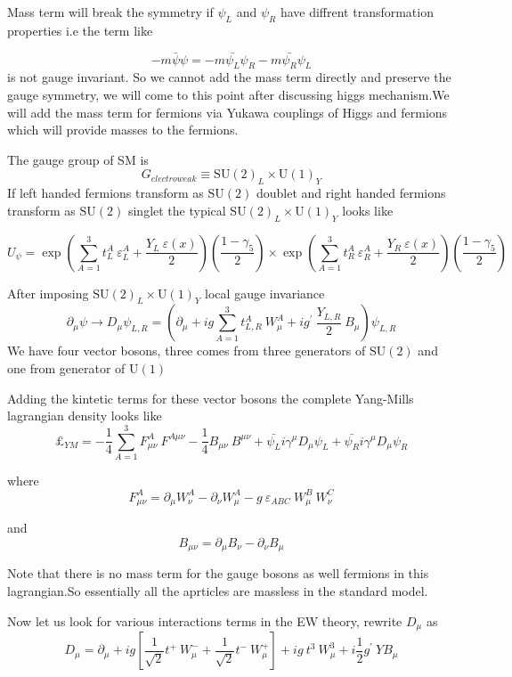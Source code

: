 \documentclass[12pt]{article}
\newcommand{\be}{\begin{equation}}
\newcommand{\ee}{\end{equation}}
\begin{document}
Mass term will break the symmetry if $\psi_{L}$ and $\psi_{R}$  have diffrent transformation properties i.e the term like 

%
\be-m\bar{\psi}\psi=-m\bar{\psi_{L}}\psi_{R}-m\bar{\psi_{R}}\psi_{L}\ee
%
is not gauge invariant. So we cannot add the mass term directly and preserve the gauge symmetry, we will come to this point after discussing higgs mechanism.We will add the mass term for fermions via Yukawa couplings of Higgs and fermions which will provide masses to the fermions.

The gauge group of SM is
%
\be G_{electroweak} \equiv  \mathrm{SU}(2)_L \times \mathrm{U}(1)_Y\ee
%
If left handed fermions transform as  $\mathrm{SU}(2)$ doublet and right handed fermions transform as $\mathrm{SU}(2)$ singlet the typical 
$  \mathrm{SU}(2)_L \times \mathrm{U}(1)_Y$ looks like
 

\be U_{\psi} = \exp{ \left( \sum_{A=1}^{3} t_{L}^{A} ~\varepsilon _{L}^{A} +\frac{Y_{L}~ \varepsilon(x)}{2} \right )} \left (\frac{1-\gamma_{5}}{2} \right )\times \exp{ \left( \sum_{A=1}^{3} t_{R}^{A}~ \varepsilon _{R}^{A} +\frac{Y_{R} ~\varepsilon(x)}{2} \right)} \left (\frac{1-\gamma_{5}}{2} \right )\ee 

After imposing $\mathrm{SU}(2)_L \times \mathrm{U}(1)_Y$ local gauge invariance
\be
{ \partial_{\mu}\psi \rightarrow D_{\mu}} \psi_{L,R} =\left (\partial_{\mu} + ig \sum_{A=1}^{3} t_{L,R}^A ~W_{\mu}^A + ig^{'}~ \frac{Y_{L,R}}{2} ~B_{\mu}\right) \psi_{L,R}
\ee
We have four vector bosons, three comes from three generators of 
$\mathrm{SU}(2)$ and one from generator of $\mathrm{U}(1)$

Adding the kintetic terms for these vector bosons the complete Yang-Mills lagrangian density  looks like
\be \pounds_{YM}= -\frac{1}{4} \sum_{A=1}^{3} F_{\mu \nu}^{A}~ F^{A \mu \nu} - \frac{1}{4}B_{\mu \nu}~ B^{\mu \nu }+ \bar{\psi_{L}} i\gamma^{\mu} D_{\mu} \psi_{L} + \bar{\psi_{R}} i\gamma^{\mu} D_{\mu} \psi_{R} \ee 

where
\be F_{\mu \nu}^{A} = \partial_{\mu} W_{\nu}^{A} - \partial_{\nu} W_{\mu}^{A} -g \ \varepsilon_{ABC} ~W_{\mu}^{B}~ W_{\nu}^{C} \ee

and 
\be B_{\mu \nu} = \partial_{\mu} B_{\nu}- \partial_{\nu} B_{\mu} \ee

Note that there is no mass term for the gauge bosons as well fermions in this lagrangian.So essentially all the aprticles are massless in the standard model.

Now let us look for various interactions terms in the EW theory, rewrite $D_{\mu}$ as
\be
{ D_{\mu}} = \partial_{\mu} +ig \left[\frac{1}{\sqrt{2}}  t^{+} ~W_{\mu}^{-}  +\frac{1}{\sqrt{2}} t^{-} ~W_{\mu}^{+}\right] +i g~ t^{3}~ W_{\mu}^{3} +i \frac{1}{2}g^{'}~YB_{\mu}\ee
\end{document}
